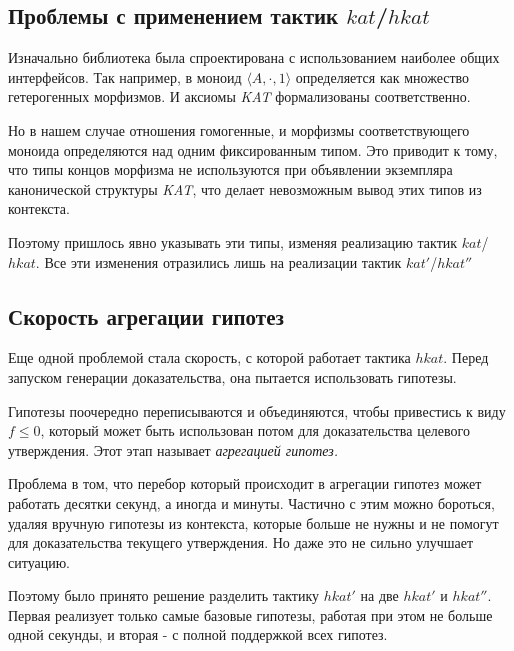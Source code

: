 \documentclass[times
              ]{itmo-student-thesis}
\begin{document}
    \subsection{Проблемы с применением тактик $kat$/$hkat$}
      Изначально библиотека была спроектирована с использованием наиболее общих интерфейсов.
      Так например, в моноид $ \langle A, \cdot, 1 \rangle $ определяется как множество гетерогенных морфизмов. И аксиомы \textit{KAT} формализованы соответственно.


      Но в нашем случае отношения гомогенные, и морфизмы соответствующего моноида определяются над одним фиксированным типом.
      Это приводит к тому, что типы концов морфизма не используются при объявлении экземпляра канонической структуры \textit{KAT},
      что делает невозможным вывод этих типов из контекста.

      Поэтому пришлось явно указывать эти типы, изменяя реализацию тактик $ kat $/$ hkat $.
      Все эти изменения отразились лишь на реализации тактик $ kat' $/$ hkat'' $

    \subsection{Скорость агрегации гипотез}

      Еще одной проблемой стала скорость, с которой работает тактика $ hkat $.
      Перед запуском генерации доказательства, она пытается использовать гипотезы.

      Гипотезы поочередно переписываются и объединяются, чтобы привестись к виду $ f \leq 0 $, который может быть использован потом для доказательства целевого утверждения.
      Этот этап называет \textit{агрегацией гипотез.}

      Проблема в том, что перебор который происходит в агрегации гипотез может работать десятки секунд, а иногда и минуты.
      Частично с этим можно бороться, удаляя вручную гипотезы из контекста, которые больше не нужны и не помогут для доказательства текущего утверждения.
      Но даже это не сильно улучшает ситуацию.

      Поэтому было принято решение разделить тактику $ hkat' $ на две $ hkat' $ и $ hkat'' $.
      Первая реализует только самые базовые гипотезы, работая при этом не больше одной секунды, и вторая - с полной поддержкой всех гипотез.
\end{document}
